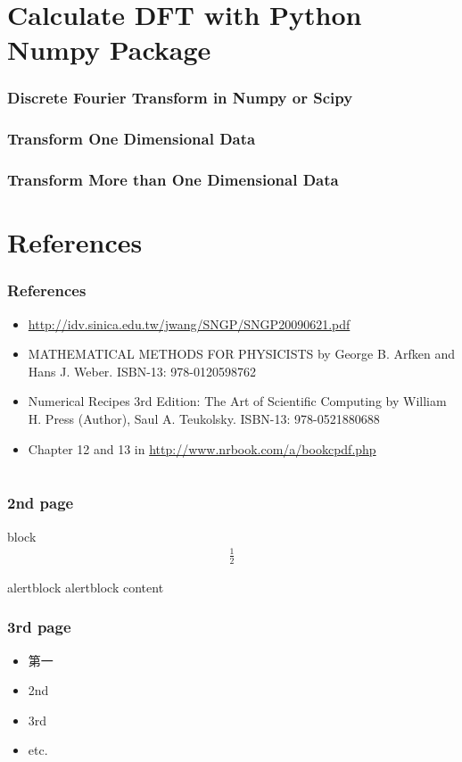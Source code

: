 \documentclass{beamer}
\begin{document}
\section{Calculate DFT with Python Numpy Package}
\begin{frame}
\frametitle{Discrete Fourier Transform in Numpy or Scipy}
\end{frame}
\begin{frame}
\frametitle{Transform One Dimensional Data}
\end{frame}
\begin{frame}
\frametitle{Transform More than One Dimensional Data}
\end{frame}
\section{References}
\begin{frame}
\frametitle{References}
\begin{itemize}
\item \url{http://idv.sinica.edu.tw/jwang/SNGP/SNGP20090621.pdf}
\item MATHEMATICAL METHODS FOR PHYSICISTS by George B. Arfken and Hans J. Weber. ISBN-13: 978-0120598762
\item Numerical Recipes 3rd Edition: The Art of Scientific Computing by William H. Press  (Author), Saul A. Teukolsky. ISBN-13: 978-0521880688
\item Chapter 12 and 13 in \url{http://www.nrbook.com/a/bookcpdf.php}
\end{itemize}
\end{frame}
\section{}
\begin{frame}
\frametitle{2nd page}
\begin{block}{block}
\begin{eqnarray}
\frac{1}{2}
\end{eqnarray}
\end{block}
\begin{alertblock}{alertblock}
alertblock content
\end{alertblock}
\end{frame}
\begin{frame}
\frametitle{3rd page}
\begin{itemize}
\item<1-> 第一
\item<1-> 2nd
\item<2-> 3rd
\item<3-> etc.
\hyperlink{1stpage}{}
\end{itemize}
\end{frame}
\end{document}
